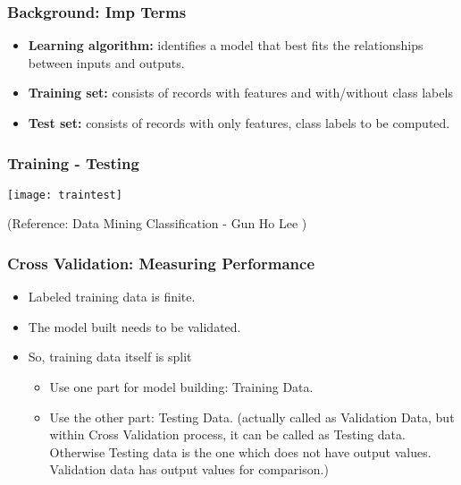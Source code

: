 \begin{frame}[fragile]\frametitle{Background: Imp Terms}

	\begin{itemize}
	\item {\bf Learning algorithm:} identifies a model that best fits the relationships between inputs and outputs. 
	\item {\bf Training set:} consists of records with features and with/without class labels 
	\item {\bf Test set:} consists of records with only features, class labels to be computed.
	\end{itemize}
\end{frame}


\begin{frame}[fragile]\frametitle{Training - Testing}
\begin{center}
\texttt{[image: traintest]}
\end{center}

\tiny{(Reference: Data Mining Classification - Gun Ho Lee )}
\end{frame}


\begin{frame}[fragile]\frametitle{Cross Validation: Measuring Performance}
\begin{itemize}
	\item Labeled training data is finite.
	\item The model built needs to be validated. 
	\item So, training data itself is split 
	\begin{itemize}
		\item Use one part for model building: Training Data.
		\item Use the other part: Testing Data. (actually called as Validation Data, but within Cross Validation process, it can be called as Testing data. Otherwise Testing data is the one which does not have output values. Validation data has output values for comparison.)
	\end{itemize}

\end{itemize}
\end{frame}


